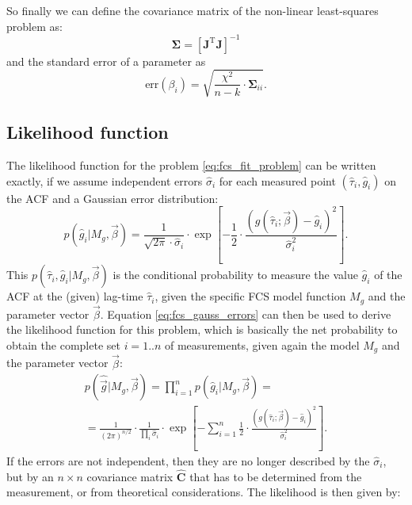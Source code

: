 \documentclass[a4paper,notitlepage]{article}
\newcommand{\mat}[1]{\mathrm{\mathbf{#1}}}
\begin{document}
So finally we can define the covariance matrix of the non-linear least-squares problem as:
\begin{equation}\label{eq:varcov_noerrors}
   \mat{\Sigma}=\left[\mat{J}^\mathrm{T}\mat{J}\right]^{-1}
\end{equation}
and the standard error of a parameter as
\begin{equation}\label{eq:stderr_noerrors}
   \mbox{err}(\beta_i)=\sqrt{\frac{\chi^2}{n-k}\cdot\mat{\Sigma}_{ii}}.
\end{equation}








\subsection{Likelihood function}
The likelihood function for the problem \eqref{eq:fcs_fit_problem} can be written exactly, if we assume independent errors $\hat{\sigma}_i$ for each measured point $(\hat{\tau}_i, \hat{g}_i)$ on the ACF and a Gaussian error distribution:
\begin{equation}\label{eq:fcs_gauss_errors}
  p(\hat{g}_i|M_g,\vec{\beta})=\frac{1}{\sqrt{2\pi}\cdot\hat{\sigma}_i}\cdot\exp\left[-\frac{1}{2}\cdot\frac{\left(g(\hat{\tau}_i;\vec{\beta})-\hat{g}_i\right)^2}{\hat{\sigma}_i^2}\right].
\end{equation}
This $p(\hat{\tau}_i,\hat{g}_i|M_g,\vec{\beta})$ is the conditional probability to measure the value $\hat{g}_i$ of the ACF at the (given) lag-time $\hat{\tau}_i$, given the specific FCS model function $M_g$ and the parameter vector $\vec{\beta}$. Equation \eqref{eq:fcs_gauss_errors} can then be used to derive the likelihood function for this problem, which is basically the net probability to obtain the complete set $i=1..n$ of measurements, given again the model $M_g$ and the parameter vector $\vec{\beta}$:
\begin{multline}\label{eq:fcs_likelihood_simple}
  p(\hat{\vec{g}}|M_g,\vec{\beta})=\prod\limits_{i=1}^np(\hat{g}_i|M_g,\vec{\beta})=\\
  =\frac{1}{(2\pi)^{n/2}}\cdot\frac{1}{\prod\limits_i\hat{\sigma}_i}\cdot\exp\left[-\sum\limits_{i=1}^n\frac{1}{2}\cdot\frac{\left(g(\hat{\tau}_i;\vec{\beta})-\hat{g}_i\right)^2}{\hat{\sigma}_i^2}\right].
\end{multline}
If the errors are not independent, then they are no longer described by the $\hat{\sigma}_i$, but by an $n\times n$ covariance matrix $\hat{\mat{C}}$ that has to be determined from the measurement, or from theoretical considerations. The likelihood is then given by:
\end{document}
